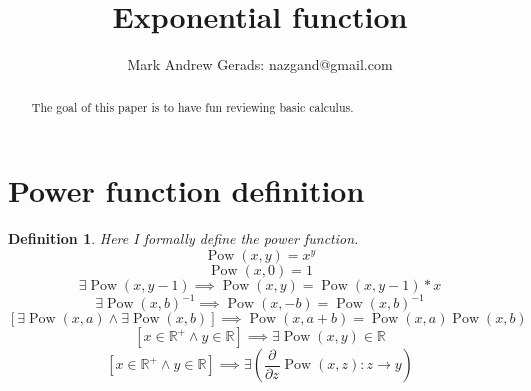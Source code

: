 \documentclass[]{article}
\author{Mark Andrew Gerads: nazgand@gmail.com}
\title{Exponential function}
\DeclareMathOperator{\pow}{Pow}
\newcommand{\pqty}[1]{{\left(#1\right)}}
\newcommand{\bqty}[1]{{\left[#1\right]}}
\newcommand{\pdiff}[2]{\frac{\partial^{#2}}{\partial #1^{#2}}}
\newtheorem{definition}[theorem]{Definition}
\numberwithin{equation}{section}
\begin{document}
	
	\maketitle
	
	\begin{abstract}
		The goal of this paper is to have fun reviewing basic calculus.
	\end{abstract}
	
	\section{Power function definition}
	\begin{definition}
			Here I formally define the power function.
		\begin{equation}
			\pow\pqty{x,y}=x^y
		\end{equation}
		\begin{equation}
			\pow\pqty{x,0}=1
		\end{equation}
		\begin{equation}
			\exists\pow\pqty{x,y-1}\implies\pow\pqty{x,y}=\pow\pqty{x,y-1}*x
		\end{equation}
		\begin{equation}
			{\exists\pow\pqty{x,b}^{-1}}\implies\pow\pqty{x,-b}=\pow\pqty{x,b}^{-1}
		\end{equation}
		\begin{equation}
			\bqty{\exists\pow\pqty{x,a}\land\exists\pow\pqty{x,b}}\implies\pow\pqty{x,a+b}=\pow\pqty{x,a}\pow\pqty{x,b}
		\end{equation}
		\begin{equation}
			\bqty{x\in\mathbb{R}^+ \land y\in\mathbb{R}}\implies\exists\pow\pqty{x,y}\in\mathbb{R}
		\end{equation}
		\begin{equation}
			\bqty{x\in\mathbb{R}^+\land y\in\mathbb{R}}
			\implies\exists\pqty{\pdiff{z}{}\pow\pqty{x,z}:z\to y}
		\end{equation}
	\end{definition}
	
\end{document}
